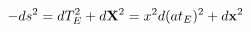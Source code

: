 \begin{equation}
    -ds^2=dT_E^2 + d{\bf X}^2 = x^2 d(at_E)^2 + d{\bf x}^2
\label{basiceuclid}
    \end{equation}

